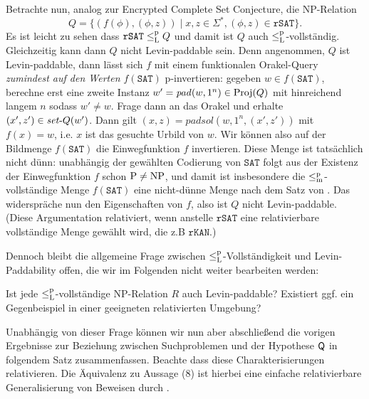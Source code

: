Betrachte nun, analog zur Encrypted Complete Set Conjecture, die NP-Relation
\[ Q = \{ (f(\phi), (\phi, z)) \mid x,z\in\Sigma^*, (\phi,z)\in\mathtt{rSAT}\}. \]
Es ist leicht zu sehen dass $\mathtt{rSAT}\leq_\mathrm{L}^\mathrm{p} Q$ und damit ist $Q$ auch $\leq_\mathrm{L}^\mathrm{p}$-vollständig.
Gleichzeitig kann dann $Q$ nicht Levin-paddable sein.
Denn angenommen, $Q$ ist Levin-paddable, dann lässt sich $f$ mit einem funktionalen Orakel-Query \emph{zumindest auf den Werten $f(\mathtt{SAT})$} p-invertieren: gegeben $w\in f(\mathtt{SAT})$, berechne erst eine zweite Instanz $w'=\mathit{pad}(w, 1^n)\in\operatorname{Proj}(Q)$ mit hinreichend langem $n$ sodass $w'\neq w$. Frage dann an das Orakel und erhalte $(x',z')\in \mathit{set}\text{-}{}Q(w')$.
Dann gilt $(x,z) = \mathit{padsol}(w, 1^n, (x',z'))$ mit $f(x)=w$, i.e. $x$ ist das gesuchte Urbild von $w$.
Wir können also auf der Bildmenge  $f(\mathtt{SAT})$ die Einwegfunktion $f$ invertieren.
Diese Menge ist tatsächlich nicht dünn: unabhängig der gewählten Codierung von $\mathtt{SAT}$ folgt aus der Existenz der Einwegfunktion $f$ schon $\mathrm{P}\neq\mathrm{NP}$, und damit ist insbesondere die $\leq_\mathrm{m}^\mathrm{p}$-vollständige Menge $f(\mathtt{SAT})$ eine nicht-dünne Menge nach dem Satz von \textcite{mahaney_sparse_1982}.
Das widerspräche nun den Eigenschaften von $f$, also ist $Q$ nicht Levin-paddable.
(Diese Argumentation relativiert, wenn anstelle $\mathtt{rSAT}$ eine relativierbare vollständige Menge gewählt wird, die z.B $\mathtt{rKAN}$.)

Dennoch bleibt die allgemeine Frage zwischen $\leq_\mathrm{L}^\mathrm{p}$-Vollständigkeit und Levin-Paddability offen, die wir im Folgenden nicht weiter bearbeiten werden:
\begin{question}
    Ist jede $\leq_\mathrm{L}^\mathrm{p}$-vollständige NP-Relation $R$ auch Levin-paddable?
    Existiert ggf. ein Gegenbeispiel in einer geeigneten relativierten Umgebung?
\end{question}


Unabhängig von dieser Frage können wir nun aber abschließend die vorigen Ergebnisse zur Beziehung zwischen Suchproblemen und der Hypothese $\mathsf{Q}$ in folgendem Satz zusammenfassen.
Beachte dass diese Charakterisierungen relativieren.
Die Äquivalenz zu Aussage (8) ist hierbei eine einfache relativierbare Generalisierung von Beweisen durch \textcite[Thm.~5.3]{messner_simulation_2001}.


